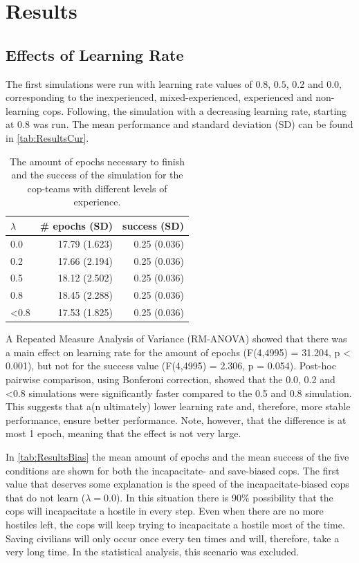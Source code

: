 \section{Results}
\subsection{Effects of Learning Rate}
The first simulations were run with learning rate values of $0.8$, $0.5$, $0.2$ and $0.0$, corresponding to the inexperienced, mixed-experienced, experienced and non-learning cops. Following, the simulation with a decreasing learning rate, starting at $0.8$ was run. The mean performance and standard deviation (SD) can be found in \autoref{tab:ResultsCur}. 

\begin{table}[!ht]
\begin{center}
\begin{tabular}{l r  r}
$\lambda$ &  \# epochs (SD) & success (SD)\\
\hline
0.0 & 17.79 (1.623) & 0.25 (0.036) \\
0.2 & 17.66 (2.194) & 0.25 (0.036) \\
0.5 & 18.12 (2.502) & 0.25 (0.036) \\
0.8 & 18.45 (2.288) & 0.25 (0.036) \\
<0.8 & 17.53 (1.825) & 0.25 (0.036) \\
\hline
\end{tabular}
\caption{The amount of epochs necessary to finish and the success of the simulation for the cop-teams with different levels of experience. }
\label{tab:ResultsCur}
\end{center}
\end{table}
A Repeated Measure Analysis of Variance (RM-ANOVA) showed that there was a main effect on learning rate for the amount of epochs (F(4,4995) = 31.204, p < 0.001), but not for the success value (F(4,4995) = 2.306, p = 0.054). Post-hoc pairwise comparison, using Bonferoni correction, showed that the 0.0, 0.2 and <0.8 simulations were significantly faster compared to the 0.5 and 0.8 simulation. This suggests that a(n ultimately) lower learning rate and, therefore, more stable performance, ensure better performance. Note, however, that the difference is at most 1 epoch, meaning that the effect is not very large. 

In \autoref{tab:ResultsBias} the mean amount of epochs and the mean success of the five conditions are shown for both the incapacitate- and save-biased cops. The first value that deserves some explanation is the speed of the incapacitate-biased cops that do not learn ($\lambda = 0.0$). In this situation there is 90\% possibility that the cops will incapacitate a hostile in every step. Even when there are no more hostiles left, the cops will keep trying to incapacitate a hostile most of the time. Saving civilians will only occur once every ten times and will, therefore, take a very long time. In the statistical analysis, this scenario was excluded. 

